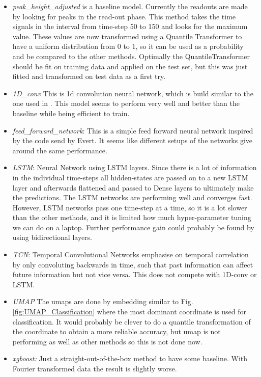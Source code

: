 \begin{itemize}
    \item \textit{peak\_height\_adjusted} is a baseline model. Currently the readouts are made by looking for peaks in the read-out phase. This method takes the time signals in the interval from time-step 50 to 150 and looks for the maximum value. These values are now transformed using a Quantile Transformer to have a uniform distribution from 0 to 1, so it can be used as a probability and be compared to the other methods. Optimally the QuantileTransformer should be fit on training data and applied on the test set, but this was just fitted and transformed on test data as a first try.
    \item \textit{1D\_conv} This is 1d convolution neural network, which is build similar to the one used in \cite{Struck2020}. This model seems to perform very well and better than the baseline while being efficient to train.
    \item \textit{feed\_forward\_network}: This is a simple feed forward neural network inspired by the code send by Evert. It seems like different setups of the networks give around the same performance.
    \item \textit{LSTM}: Neural Network using LSTM layers. Since there is a lot of information in the individual time-steps all hidden-states are passed on to a new LSTM layer and afterwards flattened and passed to Dense layers to ultimately make the predictions. The LSTM networks are performing well and converges fast. However, LSTM networks pass one time-step at a time, so it is a lot slower than the other methods, and it is limited how much hyper-parameter tuning we can do on a laptop. Further performance gain could probably be found by using bidirectional layers.
    \item \textit{TCN}: Temporal Convolutional Networks emphasise on temporal correlation by only convoluting backwards in time, such that past information can affect future information but not vice versa. This does not compete with 1D-conv or LSTM.
    \item \textit{UMAP} The umaps are done by embedding similar to Fig. \ref{fig:UMAP_Classification} where the most dominant coordinate is used for classification. It would probably be clever to do a quantile transformation of the coordinate to obtain a more reliable accuracy, but umap is not performing as well as other methods so this is not done now.
    \item \textit{xgboost:} Just a straight-out-of-the-box method to have some baseline. With Fourier transformed data the result is slightly worse.
\end{itemize}



